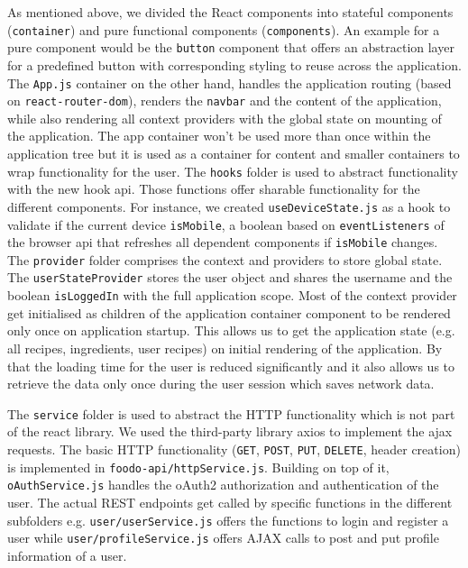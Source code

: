 As mentioned above, we divided the React components into stateful components (\texttt{container}) and pure functional components (\texttt{components}). An example for a pure component would be the \texttt{button} component that offers an abstraction layer for a predefined button with corresponding styling to reuse across the application. The \texttt{App.js} container on the other hand, handles the application routing (based on \texttt{react-router-dom}), renders the \texttt{navbar} and the content of the application, while also rendering all context providers with the global state on mounting of the application. The app container won’t be used more than once within the application tree but it is used as a container for content and smaller containers to wrap functionality for the user. The \texttt{hooks} folder is used to abstract functionality with the new hook api. Those functions offer sharable functionality for the different components. For instance, we created \texttt{useDeviceState.js} as a hook to validate if the current device \texttt{isMobile}, a boolean based on \texttt{eventListeners} of the browser api that refreshes all dependent components if \texttt{isMobile} changes. The \texttt{provider} folder comprises the context and providers to store global state. The \texttt{userStateProvider} stores the user object and shares the username and the boolean \texttt{isLoggedIn} with the full application scope. Most of the context provider get initialised as children of the application container component to be rendered only once on application startup. This allows us to get the application state (e.g. all recipes, ingredients, user recipes) on initial rendering of the application. By that the loading time for the user is reduced significantly and it also allows us to retrieve the data only once during the user session which saves network data.

The \texttt{service} folder is used to abstract the HTTP functionality which is not part of the react library. We used the third-party library axios to implement the \gls{ajax} requests. The basic HTTP functionality (\texttt{GET}, \texttt{POST}, \texttt{PUT}, \texttt{DELETE}, header creation) is implemented in \texttt{foodo-api/httpService.js}. Building on top of it, \texttt{oAuthService.js} handles the oAuth2 authorization and authentication of the user. The actual REST endpoints get called by specific functions in the different subfolders e.g. \texttt{user/userService.js} offers the functions to login and register a user while \texttt{user/profileService.js} offers AJAX calls to post and put profile information of a user.

